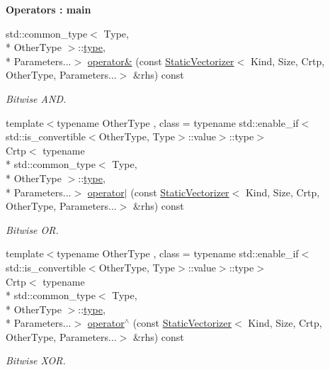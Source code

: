 \begin{Indent}{\bf Operators \-: main}
\begin{DoxyCompactItemize}
std\-::common\-\_\-type$<$ Type, \\*
Other\-Type $>$\-::\hyperlink{classmagrathea_1_1StaticVectorizer_a28c393a3896a3e839008c35d56b10a54}{type}, \\*
Parameters...$>$ \hyperlink{classmagrathea_1_1StaticVectorizer_a8a87d64ccefc340329bbd5cc1ddb9717}{operator\&} (const \hyperlink{classmagrathea_1_1StaticVectorizer}{Static\-Vectorizer}$<$ Kind, Size, Crtp, Other\-Type, Parameters...$>$ \&rhs) const 
\begin{DoxyCompactList}\small\item\em Bitwise A\-N\-D. \end{DoxyCompactList}\item 
{\footnotesize template$<$typename Other\-Type , class  = typename std\-::enable\-\_\-if$<$std\-::is\-\_\-convertible$<$\-Other\-Type, Type$>$\-::value$>$\-::type$>$ }\\Crtp$<$ typename \\*
std\-::common\-\_\-type$<$ Type, \\*
Other\-Type $>$\-::\hyperlink{classmagrathea_1_1StaticVectorizer_a28c393a3896a3e839008c35d56b10a54}{type}, \\*
Parameters...$>$ \hyperlink{classmagrathea_1_1StaticVectorizer_a9dfa7d06a43760b3550fa8e6319dee90}{operator$|$} (const \hyperlink{classmagrathea_1_1StaticVectorizer}{Static\-Vectorizer}$<$ Kind, Size, Crtp, Other\-Type, Parameters...$>$ \&rhs) const 
\begin{DoxyCompactList}\small\item\em Bitwise O\-R. \end{DoxyCompactList}\item 
{\footnotesize template$<$typename Other\-Type , class  = typename std\-::enable\-\_\-if$<$std\-::is\-\_\-convertible$<$\-Other\-Type, Type$>$\-::value$>$\-::type$>$ }\\Crtp$<$ typename \\*
std\-::common\-\_\-type$<$ Type, \\*
Other\-Type $>$\-::\hyperlink{classmagrathea_1_1StaticVectorizer_a28c393a3896a3e839008c35d56b10a54}{type}, \\*
Parameters...$>$ \hyperlink{classmagrathea_1_1StaticVectorizer_a0943fd4f6155fcd6410ffaddee1a30c3}{operator$^\wedge$} (const \hyperlink{classmagrathea_1_1StaticVectorizer}{Static\-Vectorizer}$<$ Kind, Size, Crtp, Other\-Type, Parameters...$>$ \&rhs) const 
\begin{DoxyCompactList}\small\item\em Bitwise X\-O\-R. \end{DoxyCompactList}\item 

\end{DoxyCompactItemize}
\end{Indent}

